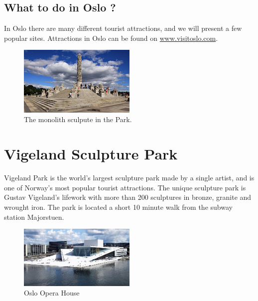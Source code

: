 \documentclass{article}
\begin{document}
\endgroup

\clearpage
\begin{center}


\section*{What to do in Oslo ?}
In Oslo there are many different tourist attractions, and we will present a few  popular sites. Attractions in Oslo can be found on \href{www.visitoslo.com}{www.visitoslo.com}.


\end{center}
\begin{figure}
    \centering
    \captionsetup{width=0.4\textwidth}
    \includegraphics[width=0.5\textwidth]{img/Vigelansparken.jpg}%
     \caption{The monolith sculpute in the Park.}
\end{figure}

\section*{Vigeland Sculpture Park}

Vigeland Park is the world's largest sculpture park made by a single artist, and is one of Norway's most popular tourist attractions. The unique sculpture park is Gustav Vigeland's lifework with more than 200 sculptures in bronze, granite and wrought iron. The park is located a short 10 minute walk from the subway station Majorstuen.

\begin{figure}
\vspace{10pt}
    \centering
    \includegraphics[width=0.5\textwidth]{img/operahouse.jpg}%
     \caption{Oslo Opera House }
\end{figure}
\end{document}
